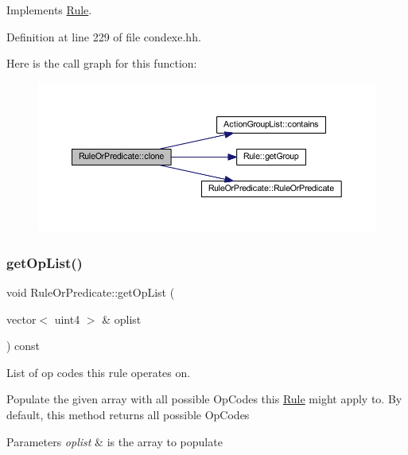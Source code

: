 Implements \mbox{\hyperlink{class_rule_a70de90a76461bfa7ea0b575ce3c11e4d}{Rule}}.



Definition at line 229 of file condexe.\+hh.

Here is the call graph for this function\+:
\nopagebreak
\begin{figure}[H]
\begin{center}
\leavevmode
\includegraphics[width=350pt]{class_rule_or_predicate_a190f266ab1a951a70b6413460c48f0fa_cgraph}
\end{center}
\end{figure}
\mbox{\label{class_rule_or_predicate_a40ca266acf32380c57cd5964d8f94adb}} 
\subsubsection{\texorpdfstring{getOpList()}{getOpList()}}
{\footnotesize\ttfamily void Rule\+Or\+Predicate\+::get\+Op\+List (\begin{DoxyParamCaption}\item[{vector$<$ uint4 $>$ \&}]{oplist }\end{DoxyParamCaption}) const\hspace{0.3cm}{\ttfamily [virtual]}}



List of op codes this rule operates on. 

Populate the given array with all possible Op\+Codes this \mbox{\hyperlink{class_rule}{Rule}} might apply to. By default, this method returns all possible Op\+Codes 
\begin{DoxyParams}{Parameters}
{\em oplist} & is the array to populate \\
\hline
\end{DoxyParams}


